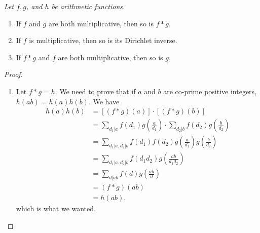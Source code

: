 \documentclass[12pt]{subfile}
\begin{document}
		\begin{theorem} \slshape \label{thm:mft}
			Let $f,g$, and $h$ be arithmetic functions.
				\begin{enumerate}
					\item If $f$ and $g$ are both multiplicative, then so is $f\ast g$.
					\item If $f$ is multiplicative, then so is its Dirichlet inverse.
					\item If $f\ast g$ and $f$ are both multiplicative, then so is $g$.
				\end{enumerate}
		\end{theorem}


		\begin{proof}
			$ $
			\begin{enumerate}
				\item Let $f\ast g=h$. We need to prove that if $a$ and $b$ are co-prime positive integers, $h(ab)=h(a)h(b)$. We have
					\begin{align*}
						h(a)h(b) &= \left[(f\ast g)(a)\right] \cdot \left[(f\ast g)(b)\right]\\
								 &= \sum\limits_{d_1|a}f(d_1)g\left(\frac{a}{d_1}\right)\cdot \sum\limits_{d_2|b}f(d_2)g\left(\frac{b}{d_2}\right)\\
								 &= \sum\limits_{d_1|a, d_2|b}f(d_1)f(d_2)g\left(\frac{a}{d_1}\right)g\left(\frac{b}{d_2}\right)\\
								 &= \sum\limits_{d_1|a, d_2|b}f(d_1d_2)g\left(\frac{ab}{d_1d_2}\right)\\
								 &= \sum\limits_{d|ab}f(d)g\left(\frac{ab}{d}\right)\\
								 &= (f\ast g)(ab)\\
								 &=h(ab),
					\end{align*}
				which is what we wanted.


\end{enumerate}
\end{proof}
\end{document}
